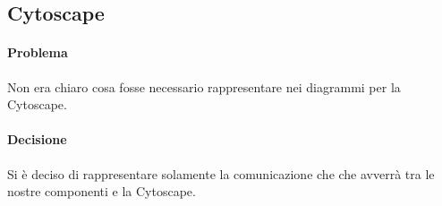 \subsection{Cytoscape}
\paragraph{Problema}
Non era chiaro cosa fosse necessario rappresentare nei diagrammi per la  Cytoscape.
\paragraph{Decisione}
Si è deciso di rappresentare solamente la comunicazione che che avverrà tra le nostre componenti e la  Cytoscape.
